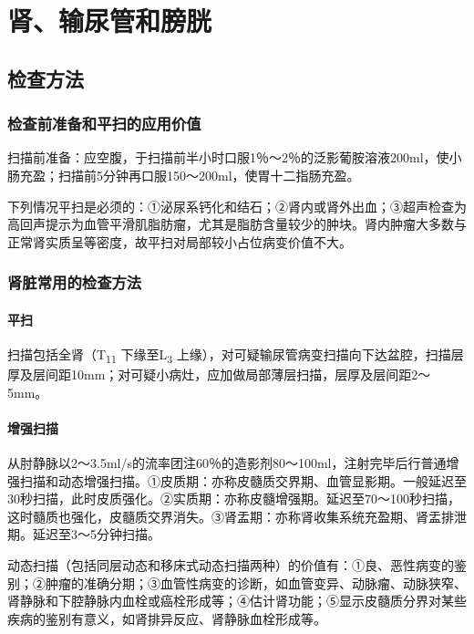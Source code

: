 \chapter{肾、输尿管和膀胱}

\section{检查方法}

\subsection{检查前准备和平扫的应用价值}

扫描前准备：应空腹，于扫描前半小时口服1％～2％的泛影葡胺溶液200ml，使小肠充盈；扫描前5分钟再口服150～200ml，使胃十二指肠充盈。

下列情况平扫是必须的：①泌尿系钙化和结石；②肾内或肾外出血；③超声检查为高回声提示为血管平滑肌脂肪瘤，尤其是脂肪含量较少的肿块。肾内肿瘤大多数与正常肾实质呈等密度，故平扫对局部较小占位病变价值不大。

\subsection{肾脏常用的检查方法}

\subsubsection{平扫}

扫描包括全肾（T\textsubscript{11} 下缘至L\textsubscript{3}
上缘），对可疑输尿管病变扫描向下达盆腔，扫描层厚及层间距10mm；对可疑小病灶，应加做局部薄层扫描，层厚及层间距2～5mm。

\subsubsection{增强扫描}

从肘静脉以2～3.5ml/s的流率团注60％的造影剂80～100ml，注射完毕后行普通增强扫描和动态增强扫描。①皮质期：亦称皮髓质交界期、血管显影期。一般延迟至30秒扫描，此时皮质强化。②实质期：亦称皮髓增强期。延迟至70～100秒扫描，这时髓质也强化，皮髓质交界消失。③肾盂期：亦称肾收集系统充盈期、肾盂排泄期。延迟至3～5分钟扫描。

动态扫描（包括同层动态和移床式动态扫描两种）的价值有：①良、恶性病变的鉴别；②肿瘤的准确分期；③血管性病变的诊断，如血管变异、动脉瘤、动脉狭窄、肾静脉和下腔静脉内血栓或癌栓形成等；④估计肾功能；⑤显示皮髓质分界对某些疾病的鉴别有意义，如肾排异反应、肾静脉血栓形成等。

